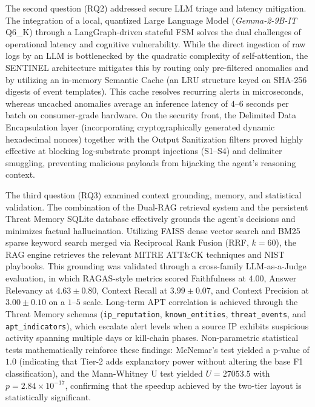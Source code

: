 The second question (RQ2) addressed secure LLM triage and latency mitigation. The integration of a local, quantized Large Language Model (\textit{Gemma-2-9B-IT} Q6\_K) through a LangGraph-driven stateful FSM solves the dual challenges of operational latency and cognitive vulnerability. While the direct ingestion of raw logs by an LLM is bottlenecked by the quadratic complexity of self-attention, the SENTINEL architecture mitigates this by routing only pre-filtered anomalies and by utilizing an in-memory Semantic Cache (an LRU structure keyed on SHA-256 digests of event templates). This cache resolves recurring alerts in microseconds, whereas uncached anomalies average an inference latency of $4$--$6$ seconds per batch on consumer-grade hardware. On the security front, the Delimited Data Encapsulation layer (incorporating cryptographically generated dynamic hexadecimal nonces) together with the Output Sanitization filters proved highly effective at blocking log-substrate prompt injections (S1--S4) and delimiter smuggling, preventing malicious payloads from hijacking the agent's reasoning context.

The third question (RQ3) examined context grounding, memory, and statistical validation. The combination of the Dual-RAG retrieval system and the persistent Threat Memory SQLite database effectively grounds the agent's decisions and minimizes factual hallucination. Utilizing FAISS dense vector search and BM25 sparse keyword search merged via Reciprocal Rank Fusion (RRF, $k=60$), the RAG engine retrieves the relevant MITRE ATT\&CK techniques and NIST playbooks. This grounding was validated through a cross-family LLM-as-a-Judge evaluation, in which RAGAS-style metrics scored Faithfulness at $4.00$, Answer Relevancy at $4.63 \pm 0.80$, Context Recall at $3.99 \pm 0.07$, and Context Precision at $3.00 \pm 0.10$ on a $1$--$5$ scale. Long-term APT correlation is achieved through the Threat Memory schemas (\texttt{ip\_reputation}, \texttt{known\_entities}, \texttt{threat\_events}, and \texttt{apt\_indicators}), which escalate alert levels when a source IP exhibits suspicious activity spanning multiple days or kill-chain phases. Non-parametric statistical tests mathematically reinforce these findings: McNemar's test yielded a p-value of $1.0$ (indicating that Tier-2 adds explanatory power without altering the base F1 classification), and the Mann-Whitney U test yielded $U=27053.5$ with $p = 2.84 \times 10^{-17}$, confirming that the speedup achieved by the two-tier layout is statistically significant.

